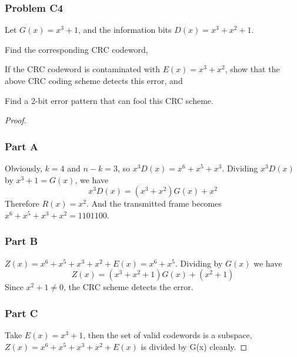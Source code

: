 \documentclass[../../../main.tex]{subfiles}
\begin{document}
\subsubsection{Problem C4}
\begin{wts}
    Let $G(x) = x^3 + 1$, and the information bits $D(x) = x^3 + x^2 + 1$.
    \begin{enumalpha}
        \item Find the corresponding CRC codeword,
        \item If the CRC codeword is contaminated with $E(x) = x^3 + x^2$, show that the above CRC coding scheme detects this error, and
        \item Find a 2-bit error pattern that can fool this CRC scheme.
    \end{enumalpha}
\end{wts}

\begin{proof}
\subsubsection*{Part A}
Obviously, $k=4$ and $n-k=3$, so $x^{3}D(x) = x^6 + x^5 + x^3$. Dividing $x^{3}D(x)$ by $x^3 + 1 = G(x)$, we have
\[
x^{3}D(x) = (x^3 + x^2)G(x) + x^2
\]
Therefore $R(x) = x^2$. And the transmitted frame becomes $x^6 + x^5 + x^3 + x^2 = 1101100$.
\subsubsection*{Part B}
$Z(x) = x^6 + x^5 + x^3 + x^2 + E(x) = x^6 + x^5$. Dividing by $G(x)$ we have
\[
Z(x) = (x^3 + x^2 + 1)G(x) + (x^2 + 1)
\]
Since $x^2 + 1\neq 0$, the CRC scheme detects the error.
\subsubsection*{Part C}
Take $E(x) = x^3 + 1$, then the set of valid codewords is a subspace, $Z(x) = x^6 + x^5 + x^3 + x^2 + E(x)$ is divided by G(x) cleanly.
\end{proof}
\end{document}
